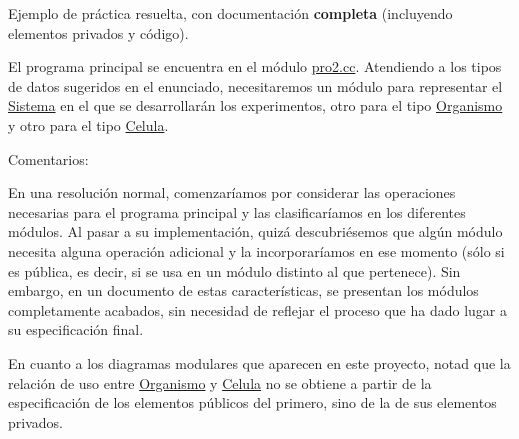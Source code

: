 Ejemplo de práctica resuelta, con documentación {\bfseries  completa} (incluyendo elementos privados y código).

El programa principal se encuentra en el módulo \hyperlink{pro2_8cc}{pro2.\+cc}. Atendiendo a los tipos de datos sugeridos en el enunciado, necesitaremos un módulo para representar el \hyperlink{class_sistema}{Sistema} en el que se desarrollarán los experimentos, otro para el tipo \hyperlink{class_organismo}{Organismo} y otro para el tipo \hyperlink{class_celula}{Celula}.

Comentarios\+:


\begin{DoxyItemize}
\item En una resolución normal, comenzaríamos por considerar las operaciones necesarias para el programa principal y las clasificaríamos en los diferentes módulos. Al pasar a su implementación, quizá descubriésemos que algún módulo necesita alguna operación adicional y la incorporaríamos en ese momento (sólo si es pública, es decir, si se usa en un módulo distinto al que pertenece). Sin embargo, en un documento de estas características, se presentan los módulos completamente acabados, sin necesidad de reflejar el proceso que ha dado lugar a su especificación final.
\item En cuanto a los diagramas modulares que aparecen en este proyecto, notad que la relación de uso entre \hyperlink{class_organismo}{Organismo} y \hyperlink{class_celula}{Celula} no se obtiene a partir de la especificación de los elementos públicos del primero, sino de la de sus elementos privados. 
\end{DoxyItemize}